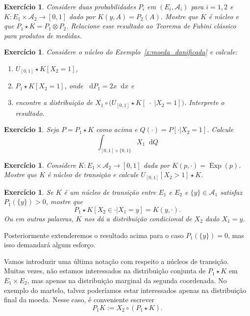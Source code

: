 \documentclass[reqno, draft]{book}
\newcommand*\1{\mathds{1}}
\newtheorem{exercise}[example]{Exercício}
\DeclareMathOperator{\Exp}{Exp}
\renewcommand*\d{\mathop{}\!\mathrm{d}}
\begin{document}
\begin{exercise}
  Considere duas probabilidades $P_i$ em $(E_i, \mathcal{A}_i)$ para $i = 1,2$ e $K:E_1 \times \mathcal{A}_2 \to [0,1]$ dado por $K(y,A) = P_2(A)$.
  Mostre que $K$ é núcleo e que $P_1 \star K = P_1 \otimes P_2$.
  Relacione esse resultado ao Teorema de Fubini clássico para produtos de medidas.
\end{exercise}

\begin{exercise}
  Considere o núcleo do Exemplo~\ref{x:moeda_danificada} e calcule:
  \begin{enumerate}[\quad a)]
  \item $U_{[0,1]} \star K [X_2 = 1]$,
  \item $P_1 \star K [X_2 = 1]$, onde $\d P_1 = 2x \d x$ e
  \item encontre a distribuição de $X_1 \circ \big( U_{[0,1]} \star K [\; \cdot \; | X_2 = 1] \big)$. Interprete o resultado.
  \end{enumerate}
\end{exercise}

\begin{exercise}
  Seja $P = P_1 \star K$ como acima e $Q(\cdot) = P[\cdot | X_2 = 1]$.
  Calcule
  \begin{equation}
    \int_{[0,1] \times \{0,1\}} X_1 \d Q
  \end{equation}
\end{exercise}

\begin{exercise}
  Considere $K:E_1 \times \mathcal{A}_2 \to [0,1]$ dada por $K(p, \cdot) = \Exp(p)$.
  Mostre que $K$ é núcleo de transição e calcule $U_{[0,1]}[X_2 > 1] \star K$.
\end{exercise}

\begin{exercise}
  Se $K$ é um núcleo de transição entre $E_1$ e $E_2$ e $\{y\} \in \mathcal{A}_1$ satisfaz $P_1(\{y\}) > 0$, mostre que
  \begin{equation}
    P_1 \star K [X_2 \in \cdot | X_1 = y] = K(y, \cdot).
  \end{equation}
  Ou em outras palavras, $K$ nos dá a distribuição condicional de $X_2$ dado $X_1 = y$.
\end{exercise}

Posteriormente extenderemos o resultado acima para o caso $P_1(\{y\}) = 0$, mas isso demandará algum esforço.

Vamos introduzir uma última notação com respeito a núcleos de transição.
Muitas vezes, não estamos interessados na distribuição conjunta de $P_1 \star K$ em $E_1 \times E_2$, mas apenas na distribuição marginal da segunda coordenada.
No exemplo do martelo, talvez poderíamos estar interessados apenas na distribuição final da moeda.
Nesse caso, é conveniente escrever
\begin{equation}
  \label{e:P1_K}
  P_1 K := X_2 \circ (P_1 \star K).
\end{equation}
\end{document}
